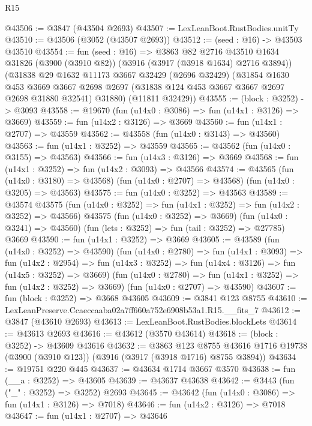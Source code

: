 \begin{lexlean}{R15}
\begin{coremodule}
@43506 := @3847 (@43504 @2693)
@43507 := LexLeanBoot.RustBodies.unitTy
@43510 := @43506 (@3052 (@43507 @2693))
@43512 := (seed : @16) -> @43503 @43510
@43554 := fun (seed : @16) =>
  @3863
    @82
    @2716
    @43510
    @1634
    @31826
    (@3900 (@3910 @82))
    (@3916 (@3917 (@3918 @1634) @2716 @3894))
    (@31838
      @29
      @1632
      @11173
      @3667
      @32429
      (@2696 @32429)
      (@31854
        @1630
        @453
        @3669
        @3667
        @2698
        @2697
        (@31838 @124 @453 @3667 @3667 @2697 @2698 @31880 @32541)
        @31880)
      (@11811 @32429))
@43555 := (block : @3252) -> @3093
@43558 := @19670 (fun (u14x0 : @3086) => fun (u14x1 : @3126) => @3669)
@43559 := fun (u14x2 : @3126) => @3669
@43560 := fun (u14x1 : @2707) => @43559
@43562 := @43558 (fun (u14x0 : @3143) => @43560)
@43563 := fun (u14x1 : @3252) => @43559
@43565 := @43562 (fun (u14x0 : @3155) => @43563)
@43566 := fun (u14x3 : @3126) => @3669
@43568 := fun (u14x1 : @3252) => fun (u14x2 : @3093) => @43566
@43574 := @43565
    (fun (u14x0 : @3180) => @43568)
    (fun (u14x0 : @2707) => @43568)
    (fun (u14x0 : @3205) => @43563)
@43575 := fun (u14x0 : @3252) => @43563
@43589 := @43574
    @43575
    (fun (u14x0 : @3252) => fun (u14x1 : @3252) => fun (u14x2 : @3252) => @43566)
    @43575
    (fun (u14x0 : @3252) => @3669)
    (fun (u14x0 : @3241) => @43560)
    (fun (lets : @3252) => fun (tail : @3252) => @27785)
    @3669
@43590 := fun (u14x1 : @3252) => @3669
@43605 := @43589
    (fun (u14x0 : @3252) => @43590)
    (fun (u14x0 : @2780) =>
    fun (u14x1 : @3093) =>
    fun (u14x2 : @2954) =>
    fun (u14x3 : @3252) => fun (u14x4 : @3126) => fun (u14x5 : @3252) => @3669)
    (fun (u14x0 : @2780) => fun (u14x1 : @3252) => fun (u14x2 : @3252) => @3669)
    (fun (u14x0 : @2707) => @43590)
@43607 := fun (block : @3252) => @3668 @43605
@43609 := @3841 @123 @8755
@43610 := LexLeanPreserve.Ccaeccaaba02a7ff660a752e6908b53a1.R15.__fits_7
@43612 := @3847 (@43610 @2693)
@43613 := LexLeanBoot.RustBodies.blockLets
@43614 := @43613 @2693
@43616 := @43612 (@3570 @43614)
@43618 := (block : @3252) -> @43609 @43616
@43632 := @3863
    @123
    @8755
    @43616
    @1716
    @19738
    (@3900 (@3910 @123))
    (@3916 (@3917 (@3918 @1716) @8755 @3894))
@43634 := @19751 @220 @445
@43637 := @43634 @1714 @3667 @3570
@43638 := fun (__a : @3252) => @43605
@43639 := @43637 @43638
@43642 := @3443 (fun ("_" : @3252) => @3252) @2693
@43645 := @43642 (fun (u14x0 : @3086) => fun (u14x1 : @3126) => @7018)
@43646 := fun (u14x2 : @3126) => @7018
@43647 := fun (u14x1 : @2707) => @43646

\end{coremodule}
\end{lexlean}
